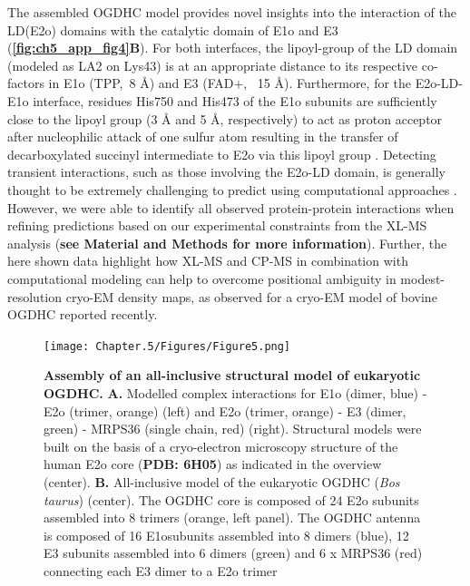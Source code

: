 The assembled OGDHC model provides novel insights into the interaction of the LD(E2o) domains with the catalytic domain of E1o and E3 (\textbf{\autoref{fig:ch5_app_fig4}B}). For both interfaces, the lipoyl-group of the LD domain (modeled as LA2 on Lys43) is at an appropriate distance to its respective co-factors in E1o (TPP,~8 Å) and E3 (FAD+, ~15 Å). Furthermore, for the E2o-LD-E1o interface, residues His750 and His473 of the E1o subunits are sufficiently close to the lipoyl group (3 Å and 5 Å, respectively) to act as proton acceptor after nucleophilic attack of one sulfur atom resulting in the transfer of decarboxylated succinyl intermediate to E2o via this lipoyl group \cite{Nemeria_2021, Pan_1998}. Detecting transient interactions, such as those involving the E2o-LD domain, is generally thought to be extremely challenging to predict using computational approaches \cite{Perrakis_2021}. However, we were able to identify all observed protein-protein interactions when refining predictions based on our experimental constraints from the XL-MS analysis (\textbf{see Material and Methods for more information}). Further, the here shown data highlight how XL-MS and CP-MS in combination with computational modeling can help to overcome positional ambiguity in modest-resolution cryo-EM density maps, as observed for a cryo-EM model of bovine OGDHC reported recently\cite{Liu_2022}. 

\begin{figure}[hbt!]
\centering
\texttt{[image: Chapter.5/Figures/Figure5.png]}
\caption{\textbf{Assembly of an all-inclusive structural model of eukaryotic OGDHC.} \textbf{A.} Modelled complex interactions for E1o (dimer, blue) - E2o (trimer, orange) (left) and E2o (trimer, orange) - E3 (dimer, green) - MRPS36 (single chain, red) (right). Structural models were built on the basis of a cryo-electron microscopy structure of the human E2o core \cite{Nagy_2021} (\textbf{PDB: 6H05}) as indicated in the overview (center). \textbf{B.}  All-inclusive model of the eukaryotic OGDHC (\emph{Bos taurus}) (center). The OGDHC core is composed of 24 E2o subunits assembled into 8 trimers (orange, left panel). The OGDHC antenna is composed of 16 E1osubunits assembled into 8 dimers (blue), 12 E3 subunits assembled into 6 dimers (green) and 6 x MRPS36 (red) connecting each E3 dimer to a E2o trimer}
\label{fig:ch5_fig5}
\end{figure}

